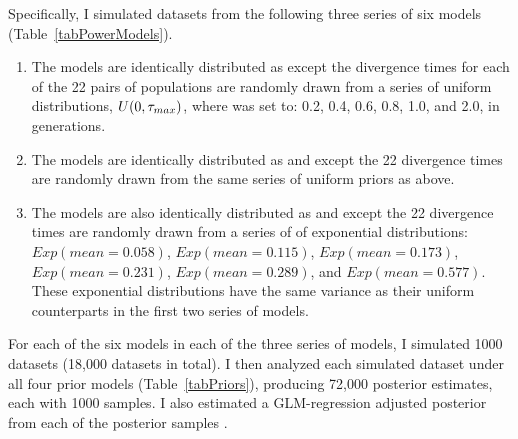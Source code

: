 Specifically, I simulated datasets from the following three series of six
models (Table~\ref{tabPowerModels}).
\begin{enumerate}
    \item The \powerSeriesOld models are identically distributed as \modelOld
        except the divergence times for each of the 22 pairs of
        populations are randomly drawn from a series of uniform distributions,
        $U(0, \tau_{max})$, where  was set to: 0.2, 0.4, 0.6, 0.8,
        1.0, and 2.0, in \globalcoalunit generations.
    \item The \powerSeriesUniform models are identically distributed as
        \modelUniform and \modelDPP except the 22 divergence times are
        randomly drawn from the same series of uniform priors as above.
    \item The \powerSeriesExp models are also identically distributed as
        \modelUniform and \modelDPP except the 22 divergence times are
        randomly drawn from a series of of exponential distributions:
        $Exp(mean=0.058)$, $Exp(mean=0.115)$, $Exp(mean=0.173)$,
        $Exp(mean=0.231)$, $Exp(mean=0.289)$, and $Exp(mean=0.577)$. These
        exponential distributions have the same variance as their uniform
        counterparts in the first two series of models.
\end{enumerate}
For each of the six models in each of the three series of models, I simulated
1000 datasets (18,000 datasets in total).
I then analyzed each simulated dataset under all four prior models
(Table~\ref{tabPriors}), producing 72,000 posterior estimates, each with 1000
samples.
I also estimated a GLM-regression adjusted posterior from each of the
posterior samples \cite{Leuenberger2010}.

